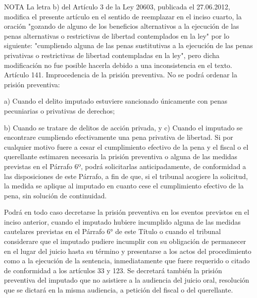 NOTA
      La letra b) del Artículo 3 de la Ley 20603, publicada el 27.06.2012, modifica el presente artículo en el sentido de reemplazar en el inciso cuarto, la oración "gozando de alguno de los beneficios alternativos a la ejecución de las penas alternativas o restrictivas de libertad contemplados en la ley" por lo siguiente: "cumpliendo alguna de las penas sustitutivas a la ejecución de las penas privativas o restrictivas de libertad contempladas en la ley", pero dicha modificación no fue posible hacerla debido a una inconsistencia en el texto.
    Artículo 141. Improcedencia de la prisión preventiva. No se podrá ordenar la prisión preventiva:

    a) Cuando el delito imputado estuviere sancionado únicamente con penas pecuniarias o privativas de derechos;

    b) Cuando se tratare de delitos de acción privada, y
    c) Cuando el imputado se encontrare cumpliendo efectivamente una pena privativa de libertad. Si por cualquier motivo fuere a cesar el cumplimiento efectivo de la pena y el fiscal o el querellante estimaren necesaria la prisión preventiva o alguna de las medidas previstas en el Párrafo 6º, podrá solicitarlas anticipadamente, de conformidad a las disposiciones de este Párrafo, a fin de que, si el tribunal acogiere la solicitud, la medida se aplique al imputado en cuanto cese el cumplimiento efectivo de la pena, sin solución de continuidad.

      Podrá en todo caso decretarse la prisión preventiva en los eventos previstos en el inciso anterior, cuando el imputado hubiere incumplido alguna de las medidas cautelares previstas en el Párrafo 6° de este Título o cuando el tribunal considerare que el imputado pudiere incumplir con su obligación de permanecer en el lugar del juicio hasta su término y presentarse a los actos del procedimiento como a la ejecución de la sentencia, inmediatamente que fuere requerido o citado de conformidad a los artículos 33 y 123. Se decretará también la prisión preventiva del imputado que no asistiere a la audiencia del juicio oral, resolución que se dictará en la misma audiencia, a petición del fiscal o del querellante.

